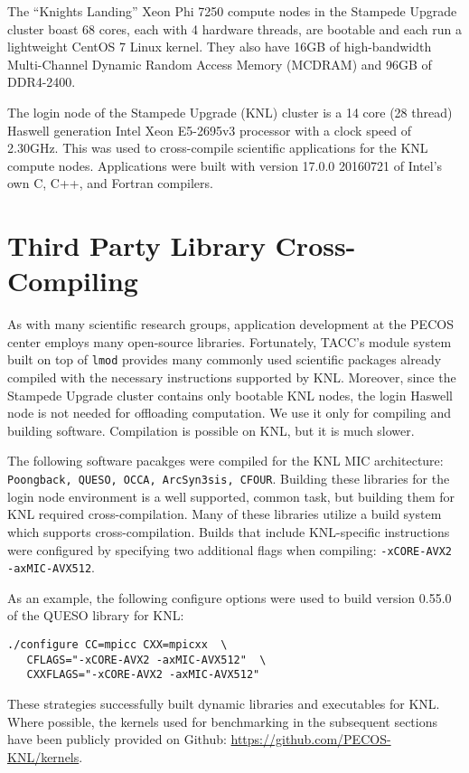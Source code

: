 The ``Knights Landing'' Xeon Phi 7250 compute nodes in the Stampede Upgrade
cluster boast 68 cores, each with 4 hardware threads, are bootable and each run
a lightweight CentOS 7 Linux kernel.  They also have 16GB of high-bandwidth
Multi-Channel Dynamic Random Access Memory (MCDRAM) and 96GB of DDR4-2400.

The login node of the Stampede Upgrade (KNL) cluster is a 14 core (28 thread)
Haswell generation Intel Xeon E5-2695v3 processor with a clock speed of
2.30GHz.  This was used to cross-compile scientific applications for the KNL
compute nodes.  Applications were built with version 17.0.0 20160721 of Intel's
own C, C++, and Fortran compilers.

\section{Third Party Library Cross-Compiling}
\label{sec:cross_compile}

As with many scientific research groups, application development at the PECOS
center employs many open-source libraries.  Fortunately, TACC's module system
built on top of \texttt{lmod} provides many commonly used scientific packages
already compiled with the necessary instructions supported by KNL.  Moreover,
since the Stampede Upgrade cluster contains only bootable KNL nodes, the login
Haswell node is not needed for offloading computation.  We use it only for
compiling and building software.  Compilation is possible on KNL, but it is
much slower.

The following software pacakges were compiled for the KNL MIC architecture:
\texttt{Poongback, QUESO, OCCA, ArcSyn3sis, CFOUR}.  Building these libraries
for the login node environment is a well supported, common task, but building
them for KNL required cross-compilation.  Many of these libraries utilize a
build system which supports cross-compilation.  Builds that include
KNL-specific instructions were configured by specifying two additional flags
when compiling: \texttt{-xCORE-AVX2 -axMIC-AVX512}.

As an example, the following configure options were used to build version
0.55.0 of the QUESO library for KNL:

{\small
\begin{verbatim}
./configure CC=mpicc CXX=mpicxx  \
   CFLAGS="-xCORE-AVX2 -axMIC-AVX512"  \
   CXXFLAGS="-xCORE-AVX2 -axMIC-AVX512"
\end{verbatim}
}

These strategies successfully built dynamic libraries and executables for KNL.
Where possible, the kernels used for benchmarking in the subsequent sections have been 
publicly provided on Github: \url{https://github.com/PECOS-KNL/kernels}. 
